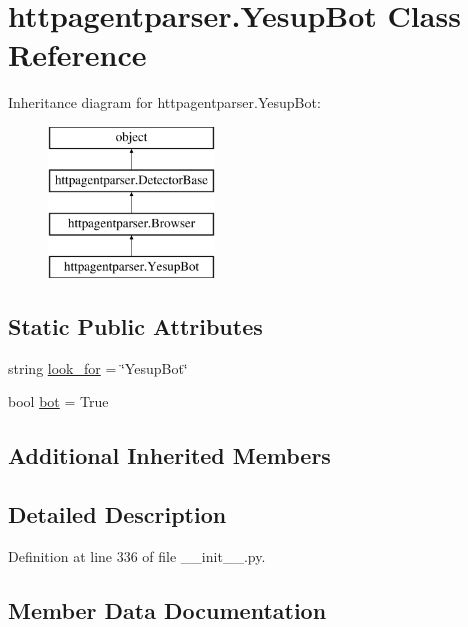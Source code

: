 \hypertarget{classhttpagentparser_1_1_yesup_bot}{}\section{httpagentparser.\+Yesup\+Bot Class Reference}
\label{classhttpagentparser_1_1_yesup_bot}
Inheritance diagram for httpagentparser.\+Yesup\+Bot\+:\begin{figure}[H]
\begin{center}
\leavevmode
\includegraphics[height=4.000000cm]{classhttpagentparser_1_1_yesup_bot}
\end{center}
\end{figure}
\subsection*{Static Public Attributes}
\begin{DoxyCompactItemize}
\item 
string \hyperlink{classhttpagentparser_1_1_yesup_bot_a6b50a26f418333b876bc49ba88853b8c}{look\+\_\+for} = \char`\"{}Yesup\+Bot\char`\"{}
\item 
bool \hyperlink{classhttpagentparser_1_1_yesup_bot_a75c0054ad3a21d71e38dbb6a086e819b}{bot} = True
\end{DoxyCompactItemize}
\subsection*{Additional Inherited Members}


\subsection{Detailed Description}


Definition at line 336 of file \+\_\+\+\_\+init\+\_\+\+\_\+.\+py.



\subsection{Member Data Documentation}
\hypertarget{classhttpagentparser_1_1_yesup_bot_a75c0054ad3a21d71e38dbb6a086e819b}{}\label{classhttpagentparser_1_1_yesup_bot_a75c0054ad3a21d71e38dbb6a086e819b} 
